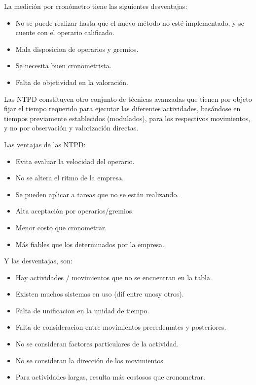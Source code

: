 \documentclass[a4paper,oneside,11pt]{article}
\begin{document}
La medición por cronómetro tiene las siguientes desventajas:
\begin{itemize}
    \item No se puede realizar hasta que el nuevo método no esté implementado, y se cuente con el operario calificado.
    \item Mala disposicion de operarios y gremios.
    \item Se necesita buen cronometrista.
    \item Falta de objetividad en la valoración.
\end{itemize}

Las NTPD constituyen otro conjunto de técnicas avanzadas que tienen por objeto fijar el tiempo requerido para ejecutar las diferentes actividades, basándose en tiempos previamente establecidos (modulados), para los respectivos movimientos, y no por observación y valorización directas.

Las ventajas de las NTPD:
\begin{itemize}
    \item Evita evaluar la velocidad del operario.
    \item No se altera el ritmo de la empresa.
    \item Se pueden aplicar a tareas que no se están realizando.
    \item Alta aceptación por operarios/gremios.
    \item Menor costo que cronometrar.
    \item Más fiables que los determinados por la empresa.
\end{itemize}

Y las desventajas, son:
\begin{itemize}
    \item Hay actividades / movimientos que no se encuentran en la tabla.
    \item Existen muchos sistemas en uso (dif entre unosy otros).
    \item Falta de unificacion en la unidad de tiempo.
    \item Falta de consideracion entre movimientos precedenmtes y posteriores.
    \item No se consideran factores particulares de la actividad.
    \item No se consideran la dirección de los movimientos.
    \item Para actividades largas, resulta más costosos que cronometrar.
\end{itemize}
\end{document}
